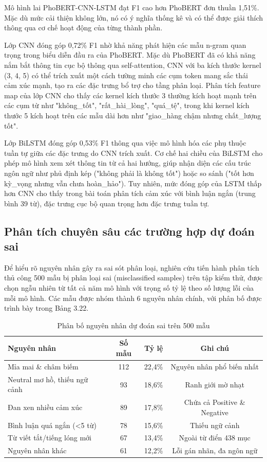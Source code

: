 \documentclass[14pt, a4paper]{report}
\begin{document}
Mô hình lai PhoBERT-CNN-LSTM đạt F1 cao hơn PhoBERT đơn thuần 1,51\%. Mặc dù mức cải thiện không lớn, nó có ý nghĩa thống kê và có thể được giải thích thông qua cơ chế hoạt động của từng thành phần.


Lớp CNN đóng góp 0,72\% F1 nhờ khả năng phát hiện các mẫu n-gram quan trọng trong biểu diễn đầu ra của PhoBERT. Mặc dù PhoBERT đã có khả năng nắm bắt thông tin cục bộ thông qua self-attention, CNN với ba kích thước kernel (3, 4, 5) có thể trích xuất một cách tường minh các cụm token mang sắc thái cảm xúc mạnh, tạo ra các đặc trưng bổ trợ cho tầng phân loại. Phân tích feature map của lớp CNN cho thấy các kernel kích thước 3 thường kích hoạt mạnh trên các cụm từ như "không\_tốt", "rất\_hài\_lòng", "quá\_tệ", trong khi kernel kích thước 5 kích hoạt trên các mẫu dài hơn như "giao\_hàng chậm nhưng chất\_lượng tốt".


Lớp BiLSTM đóng góp 0,53\% F1 thông qua việc mô hình hóa các phụ thuộc tuần tự giữa các đặc trưng do CNN trích xuất. Cơ chế hai chiều của BiLSTM cho phép mô hình xem xét thông tin từ cả hai hướng, giúp nhận diện các cấu trúc ngôn ngữ như phủ định kép ("không phải là không tốt") hoặc so sánh ("tốt hơn kỳ\_vọng nhưng vẫn chưa hoàn\_hảo"). Tuy nhiên, mức đóng góp của LSTM thấp hơn CNN cho thấy trong bài toán phân tích cảm xúc với bình luận ngắn (trung bình 39 từ), đặc trưng cục bộ quan trọng hơn đặc trưng tuần tự.


\subsection{Phân tích chuyên sâu các trường hợp dự đoán sai}


Để hiểu rõ nguyên nhân gây ra sai sót phân loại, nghiên cứu tiến hành phân tích thủ công 500 mẫu bị phân loại sai (misclassified samples) trên tập kiểm thử, được chọn ngẫu nhiên từ tất cả năm mô hình với trọng số tỷ lệ theo số lượng lỗi của mỗi mô hình. Các mẫu được nhóm thành 6 nguyên nhân chính, với phân bố được trình bày trong Bảng 3.22.


\begin{table}[h]
\centering
\caption{Phân bố nguyên nhân dự đoán sai trên 500 mẫu}
\begin{tabular}{|l|c|c|c|}
\hline
\textbf{Nguyên nhân} & \textbf{Số mẫu} & \textbf{Tỷ lệ} & \textbf{Ghi chú} \\
\hline
Mỉa mai \& châm biếm & 112 & 22,4\% & Nguyên nhân phổ biến nhất \\
\hline
Neutral mơ hồ, thiếu ngữ cảnh & 93 & 18,6\% & Ranh giới mờ nhạt \\
\hline
Đan xen nhiều cảm xúc & 89 & 17,8\% & Chứa cả Positive \& Negative \\
\hline
Bình luận quá ngắn (<5 từ) & 78 & 15,6\% & Thiếu ngữ cảnh \\
\hline
Từ viết tắt/tiếng lóng mới & 67 & 13,4\% & Ngoài từ điển 438 mục \\
\hline
Nguyên nhân khác & 61 & 12,2\% & Lỗi gán nhãn, đa ngôn ngữ \\
\hline
\end{tabular}
\end{table}
\end{document}

